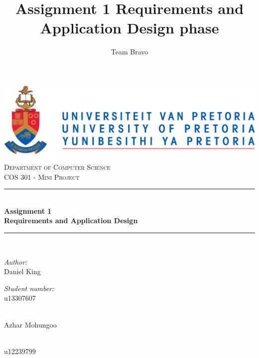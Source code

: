 \documentclass[a4paper,12pt]{report}
\author{Team Bravo}
\title{ Assignment 1 Requirements and Application Design phase}
\newcommand{\HRule}{\rule{\linewidth}{0.5mm}}
\begin{document}
\setlength{\parskip}{6pt}

\begin{titlepage}

\begin{center}
\includegraphics[width=1\textwidth]{./University_of_Pretoria_Logo.PNG}\\[0.4cm]    
\textsc{\LARGE Department of Computer Science}\\[1.5cm]
\textsc{\Large COS 301 - Mini Project}\\[0.5cm]
\HRule \\[0.4cm]
{ \huge \bfseries Assignment 1 \\ Requirements and Application Design}\\[0.4cm]
\HRule \\[0.4cm]
\begin{minipage}{0.4\textwidth}
\begin{flushleft} \large
\emph{Author:}\\
Daniel {King}
\end{flushleft}
\end{minipage}
\begin{minipage}{0.4\textwidth}
\begin{flushright} \large
\emph{Student number:} \\
u13307607
\end{flushright}
\end{minipage}
\begin{minipage}{0.4\textwidth}
\begin{flushleft} \large
\emph{} \\
Azhar {Mohungoo }
\end{flushleft}
\end{minipage}
\begin{minipage}{0.4\textwidth}
\begin{flushright} \large
\emph{} \\
u12239799
\end{flushright}
\end{minipage}
\begin{minipage}{0.4\textwidth}

\end{minipage}
\end{center}
\end{titlepage}
\end{document}
